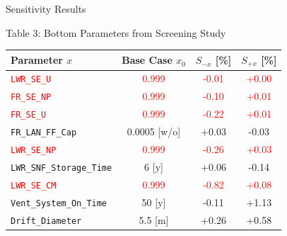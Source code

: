 \documentclass[pdf, autumn, slideColor, nocolorBG]{prosper}
\newcommand{\FigCaption}[1]{\begin{center}{\tiny{#1}}\end{center}}
\newcommand{\Red}[1]{\textcolor{red}{#1}}
\begin{document}
\begin{slide}{Sensitivity Results}

\small
\begin{center}
\FigCaption{Table 3: Bottom Parameters from Screening Study}
\begin{tabular}{|l|c|c|c|}
\hline
\textbf{Parameter $x$}           & \textbf{Base Case $x_0$}    & \textbf{$S_{-x}$} [\%] & \textbf{$S_{+x}$} [\%]\\
\hline
\Red{\texttt{LWR\_SE\_U}}        & \Red{0.999}                 & \Red{-0.01}      & \Red{+0.00} \\
\hline
\Red{\texttt{FR\_SE\_NP}}        & \Red{0.999}                 & \Red{-0.10}      & \Red{+0.01} \\
\hline
\Red{\texttt{FR\_SE\_U}}         & \Red{0.999}                 & \Red{-0.22}      & \Red{+0.01} \\
\hline
\texttt{FR\_LAN\_FF\_Cap}        & 0.0005 [w/o]                & +0.03            & -0.03 \\
\hline
\Red{\texttt{LWR\_SE\_NP}}       & \Red{0.999}                 & \Red{-0.26}      & \Red{+0.03} \\
\hline
\texttt{LWR\_SNF\_Storage\_Time} & 6 [y]                       & +0.06            & -0.14 \\
\hline
\Red{\texttt{LWR\_SE\_CM}}       & \Red{0.999}                 & \Red{-0.82}      & \Red{+0.08} \\
\hline
\texttt{Vent\_System\_On\_Time}  & 50 [y]                      & -0.11            & +1.13 \\
\hline
\texttt{Drift\_Diameter}         & 5.5 [m]                     & +0.26            & +0.58 \\
\hline
\end{tabular}
\end{center}

\end{slide}
\end{document}
